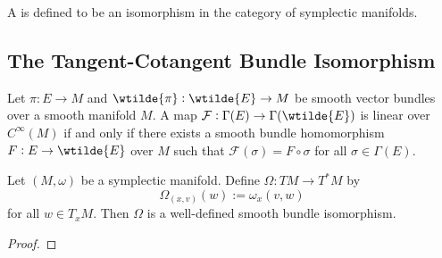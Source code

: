 \begin{definition}[Symplectomorphism]
	A  is defined to be an isomorphism in the category of symplectic manifolds.
\end{definition}

\subsection*{The Tangent-Cotangent Bundle Isomorphism}


\begin{theorem}
	\label{thm:bundle_homomorphism_characterisation_lemma}
	Let $\pi : E \to M$ and $\wtilde{\pi} : \wtilde{E} \to M$ be smooth vector bundles over a smooth manifold $M$. A map $\mathcal{F} : \Gamma(E) \to \Gamma(\wtilde{E})$ is linear over $C^\infty(M)$ if and only if there exists a smooth bundle homomorphism $F : E \to \wtilde{E}$ over $M$ such that $\mathcal{F}(\sigma) = F \circ \sigma$ for all $\sigma \in \Gamma(E)$.
\end{theorem}


\begin{proposition}
	\label{prop:tangent-cotangent_bundle_isomorphism}
	Let $(M,\omega)$ be a symplectic manifold. Define $\Omega : TM \to T^*M$ by
	\begin{equation}
		\Omega_{(x,v)}(w) := \omega_x(v,w)
	\end{equation}
	\noindent for all $w \in T_xM$. Then $\Omega$ is a well-defined smooth bundle isomorphism.
\end{proposition}

\begin{proof}
	
\end{proof}
